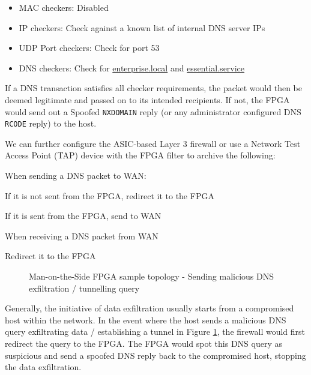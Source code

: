 \documentclass[a4paper]{report}
\newcommand{\code}{\texttt}
\newcommand{\SubItem}[1]{
    {\setlength\itemindent{15pt} \item[-] #1}
}
\begin{document}
\begin{itemize}
    \item MAC checkers: Disabled
    \item IP checkers: Check against a known list of internal DNS server IPs
    \item UDP Port checkers: Check for port 53
    \item DNS checkers: Check for \url{enterprise.local} and \url{essential.service}
\end{itemize}

If a DNS transaction satisfies all checker requirements, the packet would then be deemed legitimate and passed on to its intended recipients. If not, the FPGA would send out a Spoofed \code{NXDOMAIN} reply (or any administrator configured DNS \code{RCODE} reply) to the host.

We can further configure the ASIC-based Layer 3 firewall or use a Network Test Access Point (TAP) device with the FPGA filter to archive the following:

\begin{itemize}
    \item When sending a DNS packet to WAN:
        \SubItem    {If it is not sent from the FPGA, redirect it to the FPGA}
        \SubItem    {If it is sent from the FPGA, send to WAN}
    \item When receiving a DNS packet from WAN
        \SubItem    {Redirect it to the FPGA}
\end{itemize}


\begin{figure}[H]
  \caption{Man-on-the-Side FPGA sample topology - Sending malicious DNS exfiltration / tunnelling query}
  \label{fig:man-on-the-side-FPGA-send-malicious}
\end{figure}

Generally, the initiative of data exfiltration usually starts from a compromised host within the network. In the event where the host sends a malicious DNS query exfiltrating data / establishing a tunnel in Figure \ref{fig:man-on-the-side-FPGA-send-malicious}, the firewall would first redirect the query to the FPGA. The FPGA would spot this DNS query as suspicious and send a spoofed DNS reply back to the compromised host, stopping the data exfiltration. 
\end{document}
